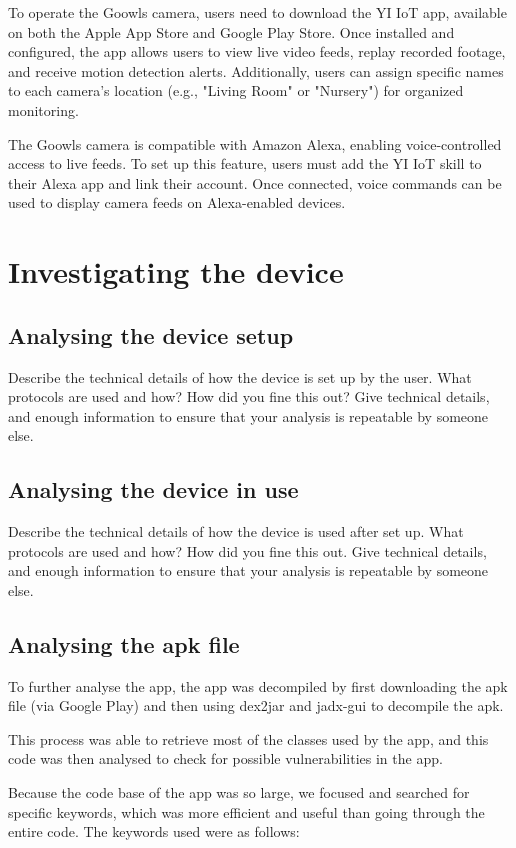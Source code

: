 \documentclass[11pt]{article}
\begin{document}
To operate the Goowls camera, users need to download the YI IoT app, available
on both the Apple App Store and Google Play Store. Once installed and
configured, the app allows users to view live video feeds, replay recorded
footage, and receive motion detection alerts. Additionally, users can assign
specific names to each camera's location (e.g., "Living Room" or "Nursery") for
organized monitoring.

The Goowls camera is compatible with Amazon Alexa, enabling voice-controlled
access to live feeds. To set up this feature, users must add the YI IoT skill
to their Alexa app and link their account. Once connected, voice commands can
be used to display camera feeds on Alexa-enabled devices.

\section{Investigating the device}

\subsection{Analysing the device setup}

Describe the technical details of how the device is set up by the user. What
protocols are used and how? How did you fine this out? Give technical details,
and enough information to ensure that your analysis is repeatable by someone
else.

\subsection{Analysing the device in use}

Describe the technical details of how the device is used after set up. What
protocols are used and how? How did you fine this out. Give technical details,
and enough information to ensure that your analysis is repeatable by someone
else.

\subsection{Analysing the apk file}

To further analyse the app, the app was decompiled by first downloading the apk file (via Google Play) and then using dex2jar and jadx-gui to decompile the apk. \par
This process was able to retrieve most of the classes used by the app, and this code was then analysed to check for possible vulnerabilities in the app. \par
Because the code base of the app was so large, we focused and searched for specific keywords, which was more efficient and useful than going through the entire code. The keywords used were as follows:
\end{document}
